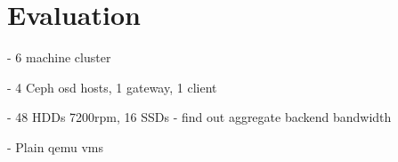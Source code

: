 \section{Evaluation}


- 6 machine cluster

- 4 Ceph osd hosts, 1 gateway, 1 client

- 48 HDDs 7200rpm, 16 SSDs - find out aggregate backend bandwidth

- Plain qemu vms
